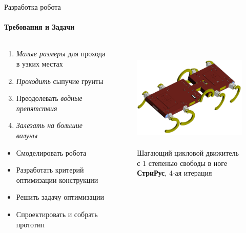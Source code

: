\documentclass[aspectratio=169,xcolor=table]{beamer}
\begin{document}
\begin{frame}[t]{Разработка робота}
    \framesubtitle{Требования и Задачи}
    \vspace{-0.5cm}
    \begin{columns}[T,onlytextwidth]
        \begin{column}{0.49\textwidth}
            \vspace{-0.2cm}
            \begin{enumerate}
                \item \textit{Малые размеры} для прохода в узких местах
                \item \textit{Проходить} сыпучие грунты
                \item Преодолевать \textit{водные препятствия}
                \item \textit{Залезать на большие валуны}
            \end{enumerate}
            \begin{itemize}
                \item Смоделировать робота
                \item Разработать критерий оптимизации конструкции
                \item Решить задачу оптимизации
                \item Спроектировать и собрать прототип
            \end{itemize}
        \end{column}
        \begin{column}{0.49\textwidth}
            \vspace{-1.1cm}
            \begin{figure}[H]
                \centering\includegraphics[height=5cm,width=1\textwidth,keepaspectratio]{strirus_4.png}
                \caption*{Шагающий цикловой движитель с 1 степенью свободы в ноге \\ \textbf{СтриРус}, 4-ая итерация}
                \label{fig:strirus_4.png}
            \end{figure}
        \end{column}
    \end{columns}
\end{frame}
\end{document}
